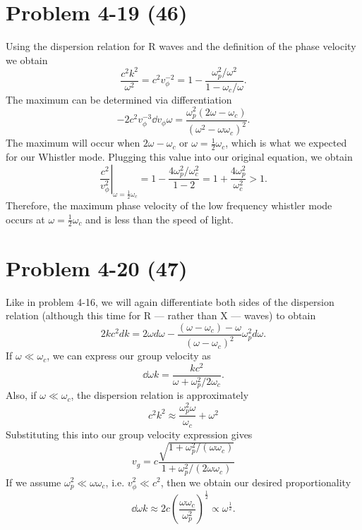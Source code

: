 \section*{Problem 4-19 (46)}
\label{sec:4-19}
Using the dispersion relation for R waves and the definition of the phase velocity we obtain
\begin{equation*}
	\dfrac{c^2k^2}{\omega^2} = c^2v_\phi^{-2} = 1 - \dfrac{\omega_p^2/\omega^2}{1 - \omega_c/\omega}.
\end{equation*}
The maximum can be determined via differentiation
\begin{equation*}
	-2c^2v_\phi^{-3}\dd{v_\phi}{\omega} = \dfrac{\omega_p^2(2\omega - \omega_c)}{\left(\omega^2 - \omega\omega_c\right)^2}.
\end{equation*}
The maximum will occur when \(2\omega - \omega_c \) or \(\omega = \frac{1}{2}\omega_c \), which is what we expected for our Whistler mode. 
Plugging this value into our original equation, we obtain
\begin{equation*}
	\left.\dfrac{c^2}{v^2_\phi}\right|_{\omega = \frac{1}{2}\omega_c} = 1 - \dfrac{4\omega_p^2/\omega_c^2}{1 - 2} = 1 + \dfrac{4\omega_p^2}{\omega_c^2} > 1.
\end{equation*}
Therefore, the maximum phase velocity of the low frequency whistler mode occurs at \(\omega = \frac{1}{2}\omega_c\) and is less than the speed of light. 

\section*{Problem 4-20 (47)}
\label{sec:4-20}
Like in problem 4-16, we will again differentiate both sides of the dispersion relation (although this time for R --- rather than X --- waves) to obtain
\begin{equation*}
	2kc^2dk = 2\omega d\omega - \dfrac{(\omega - \omega_c) - \omega}{(\omega - \omega_c)^2}\omega_p^2d\omega.
\end{equation*}
If \(\omega \ll \omega_c \), we can express our group velocity as
\begin{equation*}
	\dd{\omega}{k} = \dfrac{kc^2}{\omega + \omega_p^2/2\omega_c}.
\end{equation*}
Also, if \(\omega \ll \omega_c \), the dispersion relation is approximately
\begin{equation*}
	c^2k^2 \approx \dfrac{\omega^2_p\omega}{\omega_c} + \omega^2
\end{equation*}
Substituting this into our group velocity expression gives
\begin{equation*}
	v_g = c\dfrac{\sqrt{1 + \omega_p^2/(\omega\omega_c)}}{1 + \omega_p^2/(2\omega\omega_c)}
\end{equation*}
If we assume \(\omega_p^2 \ll \omega\omega_c \), i.e. \(v_\phi^2 \ll c^2 \), then we obtain our desired proportionality
\begin{equation*}
	\dd{\omega}{k} \approx 2c\left(\dfrac{\omega\omega_c}{\omega_p^2}\right)^{\frac{1}{2}} \propto \omega^{\frac{1}{2}}.
\end{equation*}

